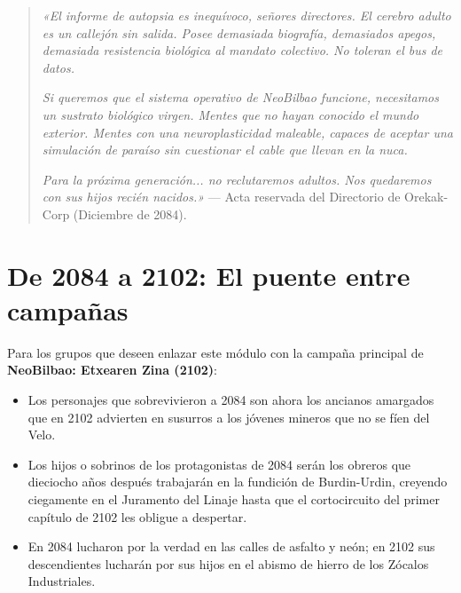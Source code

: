 \begin{quote}
\textit{«El informe de autopsia es inequívoco, señores directores. El cerebro adulto es un callejón sin salida. Posee demasiada biografía, demasiados apegos, demasiada resistencia biológica al mandato colectivo. No toleran el bus de datos.}

\textit{Si queremos que el sistema operativo de NeoBilbao funcione, necesitamos un sustrato biológico virgen. Mentes que no hayan conocido el mundo exterior. Mentes con una neuroplasticidad maleable, capaces de aceptar una simulación de paraíso sin cuestionar el cable que llevan en la nuca.}

\textit{Para la próxima generación... no reclutaremos adultos. Nos quedaremos con sus hijos recién nacidos.»}
\flushright --- Acta reservada del Directorio de Orekak-Corp (Diciembre de 2084).
\end{quote}

\section{De 2084 a 2102: El puente entre campañas}

Para los grupos que deseen enlazar este módulo con la campaña principal de \textbf{NeoBilbao: Etxearen Zina (2102)}:

\begin{itemize}
  \item {} Los personajes que sobrevivieron a 2084 son ahora los ancianos amargados que en 2102 advierten en susurros a los jóvenes mineros que no se fíen del Velo.
  \item {} Los hijos o sobrinos de los protagonistas de 2084 serán los obreros que dieciocho años después trabajarán en la fundición de Burdin-Urdin, creyendo ciegamente en el Juramento del Linaje hasta que el cortocircuito del primer capítulo de 2102 les obligue a despertar.
  \item {} En 2084 lucharon por la verdad en las calles de asfalto y neón; en 2102 sus descendientes lucharán por sus hijos en el abismo de hierro de los Zócalos Industriales.
\end{itemize}
